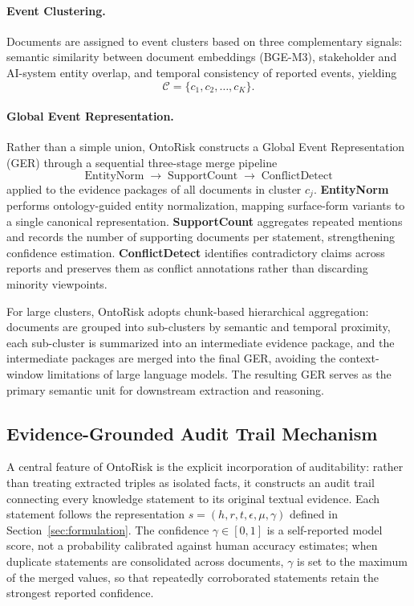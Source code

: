 \documentclass[a4paper,fleqn]{cas-dc}
\begin{document}
\paragraph{Event Clustering.}
Documents are assigned to event clusters based on three complementary
signals: semantic similarity between document embeddings (BGE-M3),
stakeholder and AI-system entity overlap, and temporal consistency of
reported events, yielding
\begin{equation}
  \mathcal{C} = \{c_1, c_2, \ldots, c_K\}.
\end{equation}

\paragraph{Global Event Representation.}
Rather than a simple union, OntoRisk constructs a Global Event
Representation (GER) through a sequential three-stage merge pipeline
\begin{equation}
  \text{EntityNorm} \;\longrightarrow\; \text{SupportCount}
  \;\longrightarrow\; \text{ConflictDetect}
\end{equation}
applied to the evidence packages of all documents in cluster $c_j$.
\textbf{EntityNorm} performs ontology-guided entity normalization,
mapping surface-form variants to a single canonical representation.
\textbf{SupportCount} aggregates repeated mentions and records the
number of supporting documents per statement, strengthening
confidence estimation.
\textbf{ConflictDetect} identifies contradictory claims across
reports and preserves them as conflict annotations rather than
discarding minority viewpoints.

For large clusters, OntoRisk adopts chunk-based hierarchical
aggregation: documents are grouped into sub-clusters by semantic and
temporal proximity, each sub-cluster is summarized into an
intermediate evidence package, and the intermediate packages are
merged into the final GER, avoiding the context-window limitations
of large language models.
The resulting GER serves as the primary semantic unit for downstream
extraction and reasoning.

\subsection{Evidence-Grounded Audit Trail Mechanism}

A central feature of OntoRisk is the explicit incorporation of
auditability: rather than treating extracted triples as isolated
facts, it constructs an audit trail connecting every knowledge
statement to its original textual evidence.
Each statement follows the representation
$s = (h, r, t, \epsilon, \mu, \gamma)$ defined in
Section~\ref{sec:formulation}.
The confidence $\gamma \in [0,1]$ is a self-reported model score,
not a probability calibrated against human accuracy estimates; when
duplicate statements are consolidated across documents, $\gamma$ is
set to the maximum of the merged values, so that repeatedly
corroborated statements retain the strongest reported confidence.
\end{document}
